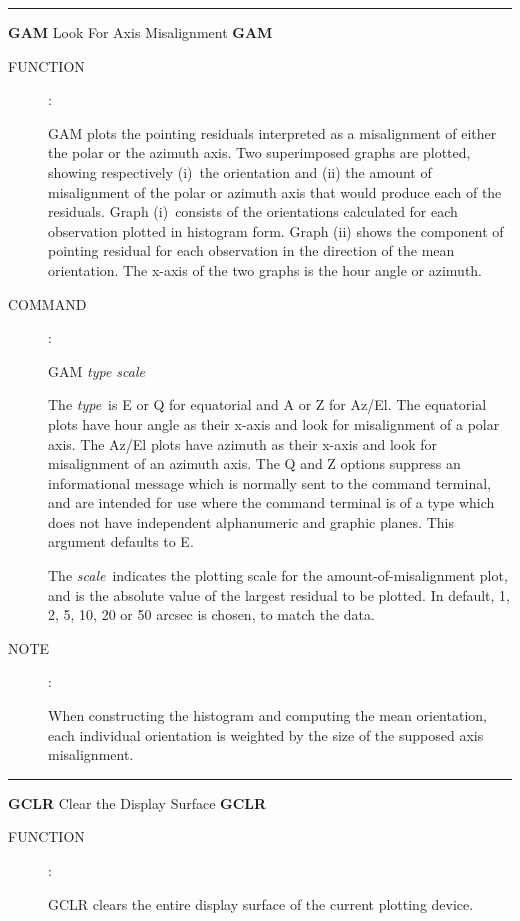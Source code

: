 
\goodbreak
\rule{\textwidth}{0.3mm}
{\Large {\bf GAM} \hfill Look For Axis Misalignment
\hfill {\bf GAM}}
\begin{description}
\item [FUNCTION]:

GAM plots the pointing residuals interpreted as a misalignment
of either the polar or the azimuth axis.  Two superimposed graphs
are plotted, showing respectively (i)~the orientation and (ii) the
amount of misalignment of the polar or azimuth axis that would
produce each of the residuals.  Graph (i)~consists of the orientations
calculated for each observation plotted in histogram form.  Graph (ii)
shows the component of pointing residual for each observation in the
direction of the mean orientation.  The x-axis of the two graphs is
the hour angle or azimuth.

\item [COMMAND]:

\begin{cmd}
\> \> GAM {\it type scale}
\end{cmd}

The {\it type}\, is E or Q for equatorial and A or Z
for Az/El.  The equatorial
plots have hour angle as their x-axis and look for misalignment of a
polar axis.  The Az/El plots have azimuth as their x-axis and look
for misalignment of an azimuth axis.  The Q and Z options
suppress an informational message which is normally sent to
the command terminal, and are intended for use where the
command terminal is of a type which does not have independent
alphanumeric and graphic planes.  This argument defaults to E.

The {\it scale}\, indicates the plotting scale for the
amount-of-misalignment plot, and is the absolute value of the
largest residual to be plotted.  In default, 1, 2, 5, 10,
20 or 50 arcsec is chosen, to match the data.

\item [NOTE]:

When constructing the histogram and computing the mean orientation,
each individual orientation is weighted by the size of the
supposed axis misalignment.

\end{description}


\goodbreak
\rule{\textwidth}{0.3mm}
{\Large {\bf GCLR} \hfill Clear the Display Surface \hfill {\bf GCLR}}
\begin{description}
\item [FUNCTION]:

GCLR clears the entire display surface of the
current plotting device.

\end{description}

